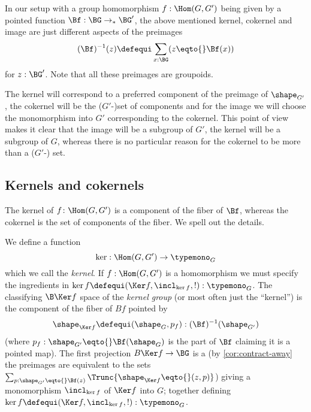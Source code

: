 
In our setup with a group homomorphism
$f:\Hom(G,G')$ being given by a pointed function $\Bf:\BG\to_*\BG'$, the above mentioned kernel, cokernel and image are just different aspects of the preimages
$$(\Bf)^{-1}(z)\defequi\sum_{x:\BG}(z\eqto{}\Bf(x))$$
for $z:\BG'$.  Note that all these preimages are groupoids.

The kernel will correspond to a preferred component of the preimage of $\shape_{G'}$, the cokernel will be the ($G'$-)set of components and for the image we will choose the monomorphism into $G'$ corresponding to the cokernel.  This point of view makes it clear that the image will be a subgroup of $G'$, the kernel will be a subgroup of $G$, whereas there is no particular reason for the cokernel to be more than a ($G'$-) set.

\subsection{Kernels and cokernels}
The kernel of $f\colon\Hom(G,G')$ is a component of the fiber of $\Bf$, whereas the cokernel is the set of components of the fiber.  We spell out the details.
\label{sec:kerandcoker}
\begin{definition}
  \label{def:kernel}
 We define a function
  $$\ker:\Hom(G,G')\to\typemono_G$$
  which we call the \emph{kernel}.
  If $f:\Hom(G,G')$  is a homomorphism we must specify the ingredients in  $\ker f\defequi(\Ker f,\incl_{\ker f},!):\typemono_G$.
  The classifying $\B\Ker f$ space of the \emph{kernel group}
 (or most often just the ``kernel'') is the component of the fiber of $Bf$ pointed by
 $$\shape_{\Ker f}\defequi(\shape_G,p_f):(\Bf)^{-1}(\shape_{G'})$$
  (where $p_f:\shape_{G'}\eqto{}\Bf(\shape_G)$ is the part of $\Bf$ claiming it is a pointed map).
The first projection $B\Ker f\to \BG$ is a \covering (by \cref{cor:contract-away} the preimages are equivalent to the sets $\sum_{p:\shape_{G'}\eqto{}\Bf(z)}\Trunc{\shape_{\Ker f}\eqto{}(z,p)}$) giving a monomorphism
$\incl_{\ker f}$ of $\Ker f$ into $G$; together defining $\ker f\defequi(\Ker f,\incl_{\ker f},!):\typemono_G$.
\end{definition}

